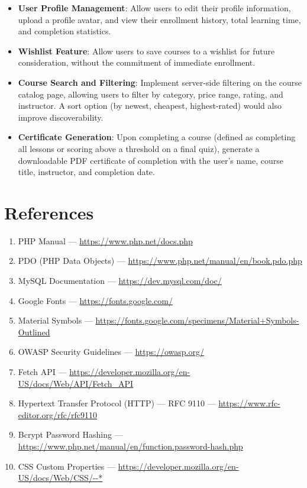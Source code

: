 \documentclass[12pt,a4paper]{report}
\begin{document}
\begin{itemize}
    \item \textbf{User Profile Management}: Allow users to edit their profile information, upload a profile avatar, and view their enrollment history, total learning time, and completion statistics.
    
    \item \textbf{Wishlist Feature}: Allow users to save courses to a wishlist for future consideration, without the commitment of immediate enrollment.
    
    \item \textbf{Course Search and Filtering}: Implement server-side filtering on the course catalog page, allowing users to filter by category, price range, rating, and instructor. A sort option (by newest, cheapest, highest-rated) would also improve discoverability.
    
    \item \textbf{Certificate Generation}: Upon completing a course (defined as completing all lessons or scoring above a threshold on a final quiz), generate a downloadable PDF certificate of completion with the user's name, course title, instructor, and completion date.
\end{itemize}

\chapter{References}

\begin{enumerate}
    \item PHP Manual — \url{https://www.php.net/docs.php}
    \item PDO (PHP Data Objects) — \url{https://www.php.net/manual/en/book.pdo.php}
    \item MySQL Documentation — \url{https://dev.mysql.com/doc/}
    \item Google Fonts — \url{https://fonts.google.com/}
    \item Material Symbols — \url{https://fonts.google.com/specimens/Material+Symbols-Outlined}
    \item OWASP Security Guidelines — \url{https://owasp.org/}
    \item Fetch API — \url{https://developer.mozilla.org/en-US/docs/Web/API/Fetch_API}
    \item Hypertext Transfer Protocol (HTTP) — RFC 9110 — \url{https://www.rfc-editor.org/rfc/rfc9110}
    \item Bcrypt Password Hashing — \url{https://www.php.net/manual/en/function.password-hash.php}
    \item CSS Custom Properties — \url{https://developer.mozilla.org/en-US/docs/Web/CSS/--*}
\end{enumerate}
\end{document}
